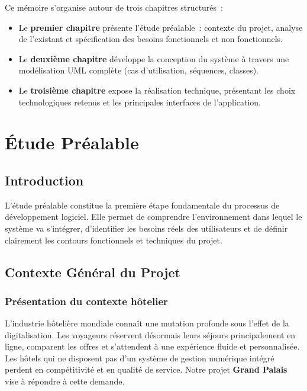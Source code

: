 \documentclass[12pt, a4paper]{report}
\begin{document}
\bigskip
Ce mémoire s'organise autour de trois chapitres structurés~:
\begin{itemize}
  \item Le \textbf{premier chapitre} présente l'étude préalable~: contexte du projet,
        analyse de l'existant et spécification des besoins fonctionnels et non fonctionnels.
  \item Le \textbf{deuxième chapitre} développe la conception du système à travers
        une modélisation UML complète (cas d'utilisation, séquences, classes).
  \item Le \textbf{troisième chapitre} expose la réalisation technique, présentant
        les choix technologiques retenus et les principales interfaces de l'application.
\end{itemize}


\chapter{Étude Préalable}

\section{Introduction}

L'étude préalable constitue la première étape fondamentale du processus de développement
logiciel. Elle permet de comprendre l'environnement dans lequel le système va s'intégrer,
d'identifier les besoins réels des utilisateurs et de définir clairement les contours
fonctionnels et techniques du projet.

\section{Contexte Général du Projet}

\subsection{Présentation du contexte hôtelier}

L'industrie hôtelière mondiale connaît une mutation profonde sous l'effet de la digitalisation.
Les voyageurs réservent désormais leurs séjours principalement en ligne, comparent les
offres et s'attendent à une expérience fluide et personnalisée. Les hôtels qui ne disposent
pas d'un système de gestion numérique intégré perdent en compétitivité et en qualité de
service. Notre projet \textbf{Grand Palais} vise à répondre à cette demande.
\end{document}
